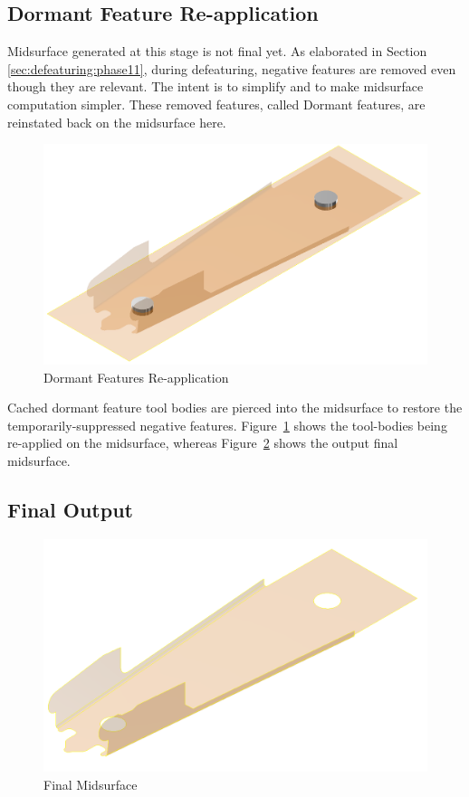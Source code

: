 \subsection{Dormant Feature Re-application}

Midsurface generated at this stage is not final yet. As elaborated in Section \ref{sec:defeaturing:phase11}, during defeaturing, negative features are removed even though they are relevant. The intent is to simplify and to make midsurface computation simpler. These removed features, called Dormant features, are reinstated back on the midsurface here. 


\begin{figure}[!h]
\centering     %
\includegraphics[width=0.62\linewidth,valign=t]{images/StaplerLower_dormant_model}
\caption{Dormant Features Re-application}
\label{fig:results:staplerlowermidsurfdormant}
\end{figure}


Cached dormant feature tool bodies are pierced into the midsurface to restore the temporarily-suppressed  negative features. Figure~\ref{fig:results:staplerlowermidsurfdormant} shows the tool-bodies being re-applied on the midsurface, whereas Figure~\ref{fig:results:staplerlowerfinalmidsurf} shows the output final midsurface.






\subsection{Final Output}

\begin{figure}[!h]
\centering     %
\includegraphics[width=0.62\linewidth,valign=t]{images/StaplerLower_finalmidsurf_model}
\caption{Final Midsurface}
\label{fig:results:staplerlowerfinalmidsurf}
\end{figure}

